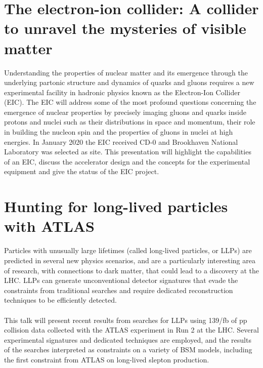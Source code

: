 \documentclass[12pt, a4paper, notitlepage, onecolumn]{article}
\begin{document}
\section{The electron-ion collider: A collider to unravel the mysteries of visible matter}
\noindent Understanding the properties of nuclear matter and its emergence through the underlying partonic structure and dynamics of quarks and gluons requires a new experimental facility in hadronic physics known as the Electron-Ion Collider (EIC). The EIC will address some of the most profound questions concerning the emergence of nuclear properties by precisely imaging gluons and quarks inside protons and nuclei such as their distributions in space and momentum, their role in building the nucleon spin and the properties of gluons in nuclei at high energies. In January 2020 the EIC received CD-0 and Brookhaven National Laboratory was selected as site. This presentation will highlight the capabilities of an EIC, discuss the accelerator design and the concepts for the experimental equipment and give the status of the EIC project.

\section{Hunting for long-lived particles with ATLAS}
\noindent Particles with unusually large lifetimes (called long-lived particles, or LLPs) are predicted in several new physics scenarios, and are a particularly interesting area of research, with connections to dark matter, that could lead to a discovery at the LHC. LLPs can generate unconventional detector signatures that evade the constraints from traditional searches and require dedicated reconstruction techniques to be efficiently detected.
\\ \\
This talk will present recent results from searches for LLPs using 139/fb of pp collision data collected with the ATLAS experiment in Run 2 at the LHC. Several experimental signatures and dedicated techniques are employed, and the results of the searches interpreted as constraints on a variety of BSM models, including the first constraint from ATLAS on long-lived slepton production.
\end{document}
